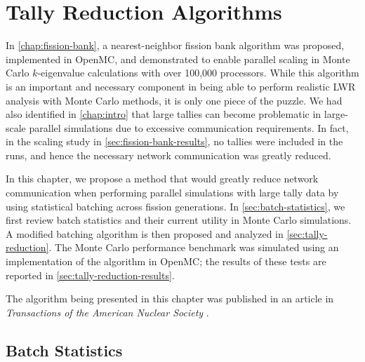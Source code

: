 \chapter{Tally Reduction Algorithms}
\label{chap:tally-reduction}

In \autoref{chap:fission-bank}, a nearest-neighbor fission bank algorithm was
proposed, implemented in OpenMC, and demonstrated to enable parallel scaling in
Monte Carlo $k$-eigenvalue calculations with over 100,000 processors. While this
algorithm is an important and necessary component in being able to perform
realistic LWR analysis with Monte Carlo methods, it is only one piece of the
puzzle. We had also identified in \autoref{chap:intro} that large tallies can
become problematic in large-scale parallel simulations due to excessive
communication requirements. In fact, in the scaling study in
\autoref{sec:fission-bank-results}, no tallies were included in the runs, and
hence the necessary network communication was greatly reduced.

In this chapter, we propose a method that would greatly reduce network
communication when performing parallel simulations with large tally data by
using statistical batching across fission generations. In
\autoref{sec:batch-statistics}, we first review batch statistics and their
current utility in Monte Carlo simulations. A modified batching algorithm is
then proposed and analyzed in \autoref{sec:tally-reduction}. The Monte Carlo
performance benchmark was simulated using an implementation of the algorithm in
OpenMC; the results of these tests are reported in
\autoref{sec:tally-reduction-results}.

The algorithm being presented in this chapter was published in an article in
\emph{Transactions of the American Nuclear Society} \cite{trans-romano-2012}.

\section{Batch Statistics}
\label{sec:batch-statistics}

